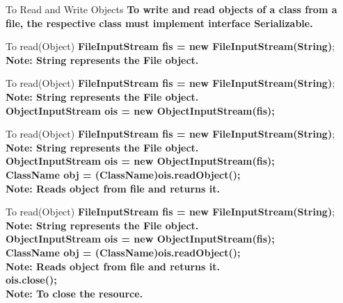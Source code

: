 \documentclass[aspectratio=169,14pt,usenames,dvipsnames]{beamer}
\begin{document}
\begin{frame}{To Read and Write Objects}
\textbf{To write and read objects of a class from a file,
the respective class must implement interface
Serializable.}
\end{frame}

\begin{frame}{To read(Object)}
\textbf{FileInputStream fis = new FileInputStream(String)};\\
\textbf{Note: String represents the File object.}\\
\end{frame}

\begin{frame}{To read(Object)}
\textbf{FileInputStream fis = new FileInputStream(String)};\\
\textbf{Note: String represents the File object.}\\
\vspace{1em}
\textbf{ObjectInputStream ois = new ObjectInputStream(fis);}
\end{frame}

\begin{frame}{To read(Object)}
\textbf{FileInputStream fis = new FileInputStream(String)};\\
\textbf{Note: String represents the File object.}\\
\vspace{1em}
\textbf{ObjectInputStream ois = new ObjectInputStream(fis);}\\
\vspace{1em}
\textbf{ClassName obj = (ClassName)ois.readObject();}\\
\textbf{Note: Reads object from file and returns it.}\\
\end{frame}

\begin{frame}{To read(Object)}
\textbf{FileInputStream fis = new FileInputStream(String)};\\
\textbf{Note: String represents the File object.}\\
\vspace{1em}
\textbf{ObjectInputStream ois = new ObjectInputStream(fis);}\\
\vspace{1em}
\textbf{ClassName obj = (ClassName)ois.readObject();}\\
\textbf{Note: Reads object from file and returns it.}\\
\vspace{1em}
\textbf{ois.close();}\\
\textbf{Note: To close the resource.}\\
\end{frame}
\end{document}
